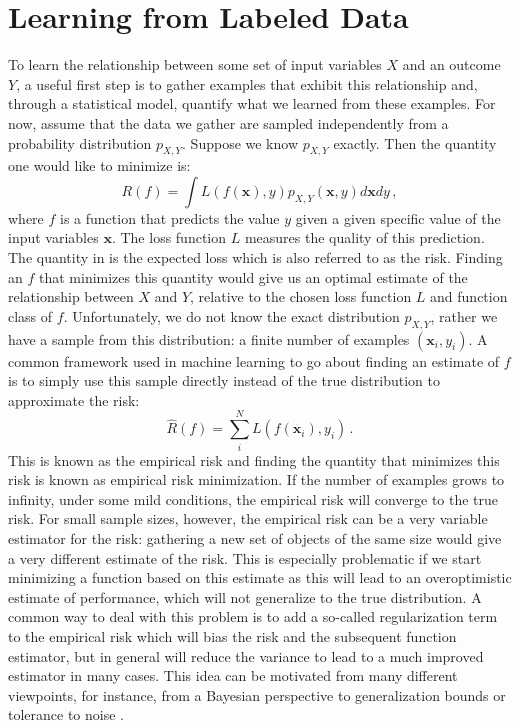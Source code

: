\documentclass[twoside]{memoir}\usepackage[]{graphicx}\usepackage{xcolor}
\begin{document}
\section{Learning from Labeled Data}
To learn the relationship between some set of input variables $X$ and an outcome $Y$, a useful first step is to gather examples that exhibit this relationship and, through a statistical model, quantify what we learned from these examples. For now, assume that the data we gather are sampled independently from a probability distribution $p_{X,Y}$. Suppose we know $p_{X,Y}$ exactly. Then the quantity one would like to minimize is:
\begin{equation} 
R(f) = \int L(f(\mathbf{x}),y) p_{X,Y}(\mathbf{x},y) d \mathbf{x} d y \,, \label{introductionrisk}
\end{equation}
where $f$ is a function that predicts the value $y$ given a given specific value of the input variables $\mathbf{x}$. The loss function $L$ measures the quality of this prediction. The quantity in  is the expected loss which is also referred to as the risk. Finding an $f$ that minimizes this quantity would give us an optimal estimate of the relationship between $X$ and $Y$, relative to the chosen loss function $L$ and function class of $f$. Unfortunately, we do not know the exact distribution $p_{X,Y}$, rather we have a sample from this distribution: a finite number of examples $(\mathbf{x}_i,y_i)$. A common framework used in machine learning to go about finding an estimate of $f$ is to simply use this sample directly instead of the true distribution to approximate the risk:
\begin{equation}
\hat{R}(f) = \sum_i^N L(f(\mathbf{x}_i),y_i)
\,.
\end{equation}
This is known as the empirical risk and finding the quantity that minimizes this risk is known as empirical risk minimization. If the number of examples grows to infinity, under some mild conditions, the empirical risk will converge to the true risk. For small sample sizes, however, the empirical risk can be a very variable estimator for the risk: gathering a new set of objects of the same size would give a very different estimate of the risk. This is especially problematic if we start minimizing a function based on this estimate as this will lead to an overoptimistic estimate of performance, which will not generalize to the true distribution. A common way to deal with this problem is to add a so-called regularization term to the empirical risk which will bias the risk and the subsequent function estimator, but in general will reduce the variance to lead to a much improved estimator in many cases. This idea can be motivated from many different viewpoints, for instance, from a Bayesian perspective \citep{BDA2013} to generalization bounds \citep{Mohri2012} or tolerance to noise \citep{Bishop1995}.
\end{document}
